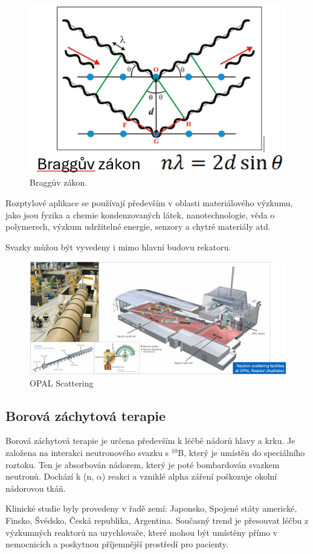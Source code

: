 \begin{figure}[H]
    \centering
    \includegraphics[width=0.5\linewidth]{img/Braggův zákon.png}
    \caption{Braggův zákon.}
    \label{fig:enter-label}
\end{figure}

Rozptylové aplikace se používají především v oblasti materiálového výzkumu, jako jsou fyzika a chemie kondenzovaných látek, nanotechnologie, věda o polymerech, výzkum udržitelné energie, senzory a chytré materiály atd.

Svazky můžou být vyvedeny i mimo hlavní budovu rekatoru. 

\begin{figure}[H]
    \centering
    \includegraphics[width=0.75\linewidth]{img/OPALScattering.png}
    \caption{OPAL Scattering}
    \label{fig:enter-label}
\end{figure}

\subsection{Borová záchytová terapie}

Borová záchytová terapie je určena především k léčbě nádorů hlavy a krku. Je založena na interakci neutronového svazku s $^{10}$B, který je umístěn do speciálního roztoku. Ten je absorbován nádorem, který je poté bombardován svazkem neutronů. Dochází k (n, $\alpha$) reakci a vzniklé alpha záření poškozuje okolní nádorovou tkáň. 

Klinické studie byly provedeny v řadě zemí: Japonsko, Spojené státy americké, Finsko, Švédsko, Česká republika, Argentina. Současný trend je přesouvat léčbu z výzkumných reaktorů na urychlovače, které mohou být umístěny přímo v nemocnicích a poskytnou příjemnější prostředí pro pacienty. 

